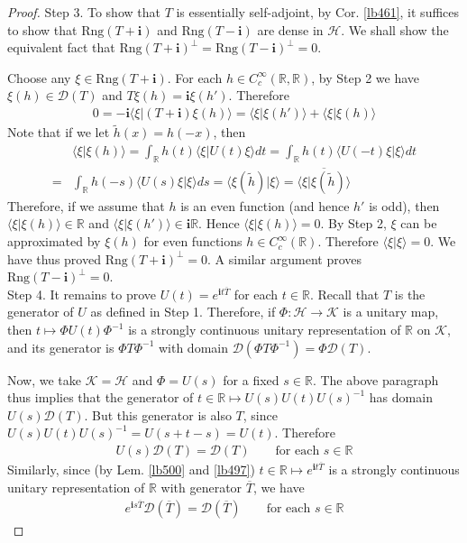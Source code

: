 \documentclass[12pt,b5paper,notitlepage]{article}
\theoremstyle{definition}
\theoremstyle{plain}
\newcommand{\wtd}{\widetilde}
\newcommand{\ovl}{\overline}
\newcommand{\Dom}{\mathscr{D}}
\newcommand{\bk}[1]{\langle {#1}\rangle}
\newcommand{\im}{\mathbf{i}}
\newcommand{\Rbb}{\mathbb R}
\newcommand{\Rng}{\mathrm{Rng}}
\newcommand{\MH}{\mathcal H}
\newcommand{\MK}{\mathcal K}
\numberwithin{equation}{section}
\begin{document}
\begin{proof}
Step 3. To show that $T$ is essentially self-adjoint, by Cor. \ref{lb461}, it suffices to show that $\Rng(T+\im)$ and $\Rng(T-\im)$ are dense in $\MH$. We shall show the equivalent fact that $\Rng(T+\im)^\perp=\Rng(T-\im)^\perp=0$.

Choose any $\xi\in\Rng(T+\im)$. For each $h\in C_c^\infty(\Rbb,\Rbb)$, by Step 2 we have $\xi(h)\in\Dom(T)$ and $T\xi(h)=\im\xi(h')$. Therefore
\begin{align*}
0=-\im\bk{\xi|(T+\im)\xi(h)}=\bk{\xi|\xi(h')}+\bk{\xi|\xi(h)}
\end{align*}
Note that if we let $\wtd h(x)=h(-x)$, then
\begin{align*}
&\bk{\xi|\xi(h)}=\int_\Rbb h(t)\bk{\xi|U(t)\xi}dt=\int_\Rbb h(t)\bk{U(-t)\xi|\xi}dt\\
=&\int_\Rbb h(-s)\bk{U(s)\xi|\xi}ds=\bk{\xi(\wtd h)|\xi}=\ovl{\bk{\xi|\xi(\wtd h)}}
\end{align*}
Therefore, if we assume that $h$ is an even function (and hence $h'$ is odd), then $\bk{\xi|\xi(h)}\in\Rbb$ and $\bk{\xi|\xi(h')}\in\im\Rbb$. Hence $\bk{\xi|\xi(h)}=0$. By Step 2, $\xi$ can be approximated by $\xi(h)$ for even functions $h\in C_c^\infty(\Rbb)$. Therefore $\bk{\xi|\xi}=0$. We have thus proved $\Rng(T+\im)^\perp=0$. A similar argument proves $\Rng(T-\im)^\perp=0$.\\[-1ex]

Step 4. It remains to prove $U(t)=e^{\im t\ovl T}$ for each $t\in\Rbb$. Recall that $T$ is the generator of $U$ as defined in Step 1. Therefore, if $\Phi:\MH\rightarrow\MK$ is a unitary map, then $t\mapsto \Phi U(t)\Phi^{-1}$ is a strongly continuous unitary representation of $\Rbb$ on $\MK$, and its generator is $\Phi T\Phi^{-1}$ with domain $\Dom(\Phi T\Phi^{-1})=\Phi\Dom(T)$.

Now, we take $\MK=\MH$ and $\Phi=U(s)$ for a fixed $s\in\Rbb$. The above paragraph thus implies that the generator of $t\in\Rbb\mapsto U(s)U(t)U(s)^{-1}$ has domain $U(s)\Dom(T)$. But this generator is also $T$, since $U(s)U(t)U(s)^{-1}=U(s+t-s)=U(t)$. Therefore
\begin{align*}
U(s)\Dom(T)=\Dom(T)\qquad\text{for each }s\in\Rbb
\end{align*}
Similarly, since (by Lem. \ref{lb500} and \ref{lb497}) $t\in\Rbb\mapsto e^{\im t\ovl T}$ is a strongly continuous unitary representation of $\Rbb$ with generator $\ovl T$, we have
\begin{align*}
e^{\im s\ovl T}\Dom(\ovl T)=\Dom(\ovl T)\qquad\text{for each }s\in\Rbb
\end{align*}


\end{proof}
\end{document}
